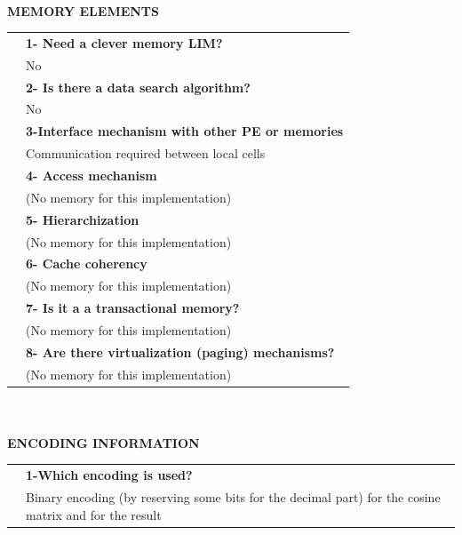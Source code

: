 \newpage{\large \textbf{\qquad }}\vspace{10pt}\\
{\large \textbf{MEMORY ELEMENTS}}\vspace{10pt}\\\begin{tabular}{ p{0.2cm} p{14.5cm}}
	&\textbf{1- Need a clever memory LIM?}\\
	&	No\vspace{7pt}\\
	&\textbf{2- Is there a data search algorithm?}\\
	&	No\vspace{7pt}\\
	&\textbf{	3-Interface mechanism with other PE or memories}\\
	&	Communication required between local cells\vspace{7pt}\\
	&	\textbf{4- Access mechanism}\\
	&	(No memory for this implementation)\vspace{7pt}\\
	&	\textbf{5- Hierarchization} \\
	&	(No memory for this implementation)\vspace{7pt}\\
	&\textbf{	6- Cache coherency} \\
	&	(No memory for this implementation)\vspace{7pt}\\
	&\textbf{	7- Is it a a transactional memory?}\\
	&	(No memory for this implementation)\vspace{7pt}\\
	&\textbf{	8- Are there virtualization (paging) mechanisms?}\\
	&	(No memory for this implementation)\end{tabular}\vspace{14pt}\\
\vspace{10pt}\\
{\large\textbf{ENCODING INFORMATION}}\vspace{10pt}\\
\begin{tabular}{ p{0.2cm} p{14.5cm}}
	&\textbf{1-Which encoding is used?}\\
	&Binary encoding (by reserving some bits for the decimal part) for the cosine matrix and for the result
\end{tabular}

